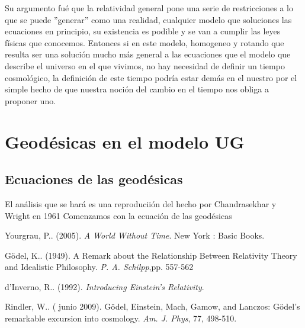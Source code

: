 \documentclass[11pt]{book}
\begin{document}
Su argumento fué que la relatividad general pone una serie de restricciones a lo que se puede ''generar'' como una realidad, cualquier modelo que soluciones las ecuaciones en principio, su existencia es podible y se van a cumplir las leyes físicas que conocemos. Entonces si en este modelo, homogeneo y rotando que resulta ser una solución mucho más general a las ecuaciones que el modelo que describe el universo en el que vivimos, no hay necesidad de definir un tiempo cosmológico, la definición de este tiempo podría estar demás en el nuestro por el simple hecho de que nuestra noción del cambio en el tiempo nos obliga a proponer uno.

\chapter{Geodésicas en el modelo UG}

\section{Ecuaciones de las geodésicas}

El análisis que se hará es una reproduciión del hecho por Chandrasekhar y Wright en 1961 %
Comenzamos con la ecuación de las geodésicas 









 \begin{thebibliography}{99}
  Yourgrau, P.. (2005). \emph{A World Without Time}. New York %
 : Basic Books.
 
  Gödel, K.. (1949). A Remark about the Relationship Between Relativity Theory and Idealistic Philosophy. \emph{P. A. Schilpp},pp. 557-562
 
  d'Inverno, R.. (1992). \emph{Introducing Einstein's Relativity}. 
 
  Rindler, W.. ( junio 2009). Gödel, Einstein, Mach, Gamow, and Lanczos: Gödel’s remarkable excursion into cosmology. \emph{Am. J. Phys}, 77, 498-510.
 
 
 \end{thebibliography}
 
\end{document}
